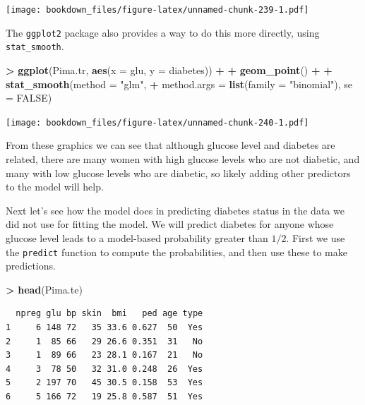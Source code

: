 \documentclass[]{krantz}
\makeatletter
\newenvironment{Shaded}{\begin{snugshade}}{\end{snugshade}}
\newcommand{\KeywordTok}[1]{\textcolor[rgb]{0.27,0.27,0.27}{\textbf{#1}}}
\newcommand{\DataTypeTok}[1]{\textcolor[rgb]{0.27,0.27,0.27}{#1}}
\newcommand{\StringTok}[1]{\textcolor[rgb]{0.5,0.5,0.5}{#1}}
\newcommand{\OtherTok}[1]{\textcolor[rgb]{0.37,0.37,0.37}{#1}}
\newcommand{\OperatorTok}[1]{\textcolor[rgb]{0.43,0.43,0.43}{\textbf{#1}}}
\newcommand{\NormalTok}[1]{#1}
\newenvironment{kframe}{%
\medskip{}
\setlength{\fboxsep}{.8em}
 \def\at@end@of@kframe{}%
 \ifinner\ifhmode%
  \def\at@end@of@kframe{\end{minipage}}%
  \begin{minipage}{\columnwidth}%
 \fi\fi%
 \def\FrameCommand##1{\hskip\@totalleftmargin \hskip-\fboxsep
 \colorbox{shadecolor}{##1}\hskip-\fboxsep
     \hskip-\linewidth \hskip-\@totalleftmargin \hskip\columnwidth}%
 \MakeFramed {\advance\hsize-\width
   \@totalleftmargin\z@ \linewidth\hsize
   \@setminipage}}%
 {\par\unskip\endMakeFramed%
 \at@end@of@kframe}
\renewenvironment{Shaded}{\begin{kframe}}{\end{kframe}}
\makeatother
\begin{document}
\texttt{[image: bookdown\_files/figure-latex/unnamed-chunk-239-1.pdf]}

The \texttt{ggplot2} package also provides a way to do this more
directly, using \texttt{stat\_smooth}.

\begin{Shaded}
\begin{Highlighting}[]
\OperatorTok{>}\StringTok{ }\KeywordTok{ggplot}\NormalTok{(Pima.tr, }\KeywordTok{aes}\NormalTok{(}\DataTypeTok{x =}\NormalTok{ glu, }\DataTypeTok{y =}\NormalTok{ diabetes)) }\OperatorTok{+}\StringTok{ }
\OperatorTok{+}\StringTok{   }\KeywordTok{geom_point}\NormalTok{() }\OperatorTok{+}\StringTok{ }
\OperatorTok{+}\StringTok{   }\KeywordTok{stat_smooth}\NormalTok{(}\DataTypeTok{method =} \StringTok{"glm"}\NormalTok{, }
\OperatorTok{+}\StringTok{               }\DataTypeTok{method.args =} \KeywordTok{list}\NormalTok{(}\DataTypeTok{family =} \StringTok{"binomial"}\NormalTok{), }\DataTypeTok{se =} \OtherTok{FALSE}\NormalTok{)}
\end{Highlighting}
\end{Shaded}

\texttt{[image: bookdown\_files/figure-latex/unnamed-chunk-240-1.pdf]}

From these graphics we can see that although glucose level and diabetes
are related, there are many women with high glucose levels who are not
diabetic, and many with low glucose levels who are diabetic, so likely
adding other predictors to the model will help.

Next let's see how the model does in predicting diabetes status in the
data we did not use for fitting the model. We will predict diabetes for
anyone whose glucose level leads to a model-based probability greater
than \(1/2\). First we use the \texttt{predict} function to compute the
probabilities, and then use these to make predictions.

\begin{Shaded}
\begin{Highlighting}[]
\OperatorTok{>}\StringTok{ }\KeywordTok{head}\NormalTok{(Pima.te)}
\end{Highlighting}
\end{Shaded}

\begin{verbatim}
  npreg glu bp skin  bmi   ped age type
1     6 148 72   35 33.6 0.627  50  Yes
2     1  85 66   29 26.6 0.351  31   No
3     1  89 66   23 28.1 0.167  21   No
4     3  78 50   32 31.0 0.248  26  Yes
5     2 197 70   45 30.5 0.158  53  Yes
6     5 166 72   19 25.8 0.587  51  Yes
\end{verbatim}
\end{document}
